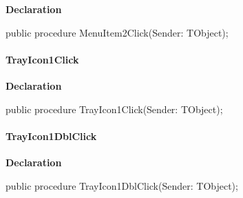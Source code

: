 \documentclass{report}
\newif\ifpdf
\begin{document}
\label{mnupdate.TUMnForm-MenuItem2Click}
\begin{list}{}{
\setlength{\itemindent}{0cm}
\setlength{\listparindent}{0cm}
\setlength{\leftmargin}{\evensidemargin}
\addtolength{\leftmargin}{\tmplength}
\settowidth{\labelsep}{X}
\addtolength{\leftmargin}{\labelsep}
\setlength{\labelwidth}{\tmplength}
}
\item[\textbf{Declaration}\hfill]
\ifpdf
\begin{flushleft}
\fi
\begin{ttfamily}
public procedure MenuItem2Click(Sender: TObject);\end{ttfamily}

\ifpdf
\end{flushleft}
\fi

\end{list}
\paragraph*{TrayIcon1Click}\hspace*{\fill}

\label{mnupdate.TUMnForm-TrayIcon1Click}
\begin{list}{}{
\setlength{\itemindent}{0cm}
\setlength{\listparindent}{0cm}
\setlength{\leftmargin}{\evensidemargin}
\addtolength{\leftmargin}{\tmplength}
\settowidth{\labelsep}{X}
\addtolength{\leftmargin}{\labelsep}
\setlength{\labelwidth}{\tmplength}
}
\item[\textbf{Declaration}\hfill]
\ifpdf
\begin{flushleft}
\fi
\begin{ttfamily}
public procedure TrayIcon1Click(Sender: TObject);\end{ttfamily}

\ifpdf
\end{flushleft}
\fi

\end{list}
\paragraph*{TrayIcon1DblClick}\hspace*{\fill}

\label{mnupdate.TUMnForm-TrayIcon1DblClick}
\begin{list}{}{
\setlength{\itemindent}{0cm}
\setlength{\listparindent}{0cm}
\setlength{\leftmargin}{\evensidemargin}
\addtolength{\leftmargin}{\tmplength}
\settowidth{\labelsep}{X}
\addtolength{\leftmargin}{\labelsep}
\setlength{\labelwidth}{\tmplength}
}
\item[\textbf{Declaration}\hfill]
\ifpdf
\begin{flushleft}
\fi
\begin{ttfamily}
public procedure TrayIcon1DblClick(Sender: TObject);\end{ttfamily}

\ifpdf
\end{flushleft}
\fi

\end{list}
\end{document}
